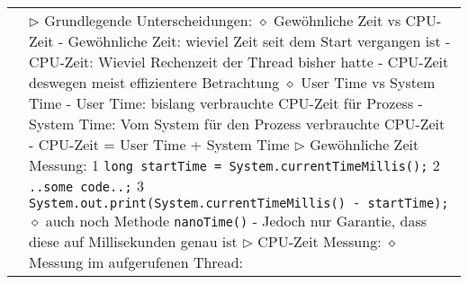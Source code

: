 	\begin{longtable}{ | p{} p{} | } 
	\hline 
	
	\makecell[l]{Laufzeit messen} & \makecell[l]{
	$\rhd$ Grundlegende Unterscheidungen: \\
	\hspace{0.4cm} $\diamond$ Gewöhnliche Zeit vs CPU-Zeit \\
	\hspace{0.6cm} - Gewöhnliche Zeit: wieviel Zeit seit dem Start vergangen ist \\
	\hspace{0.6cm} - CPU-Zeit: Wieviel Rechenzeit der Thread bisher hatte \\
	\hspace{0.6cm} - CPU-Zeit deswegen meist effizientere Betrachtung \\
	\hspace{0.4cm} $\diamond$ User Time vs System Time \\
	\hspace{0.6cm} - User Time: bislang verbrauchte CPU-Zeit für Prozess \\
	\hspace{0.6cm} - System Time: Vom System für den Prozess verbrauchte CPU-Zeit \\
	\hspace{0.6cm} - CPU-Zeit = User Time + System Time \\
	$\rhd$ Gewöhnliche Zeit Messung: \\
	\hspace{0.4cm} 1 \hspace{0.1cm} \texttt{long startTime = System.currentTimeMillis();} \\
	\hspace{0.4cm} 2 \hspace{0.1cm} \texttt{..some code..;} \\
	\hspace{0.4cm} 3 \hspace{0.1cm} \texttt{System.out.print(System.currentTimeMillis() - startTime);} \\
	\hspace{0.4cm} $\diamond$ auch noch Methode \texttt{nanoTime()} \\
	\hspace{0.6cm} - Jedoch nur Garantie, dass diese auf Millisekunden genau ist \\
	$\rhd$ CPU-Zeit Messung: \\
	\hspace{0.4cm} $\diamond$ Messung im aufgerufenen Thread: \\
}
\end{longtable}
